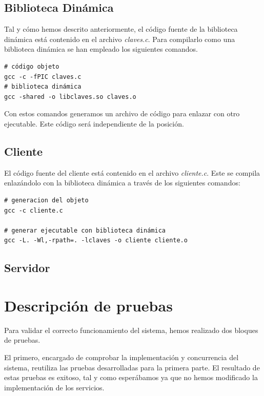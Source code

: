 \documentclass[]{article}
\begin{document}
\subsection{Biblioteca Dinámica}
\label{subsec:biblioteca}
Tal y cómo hemos descrito anteriormente, el código fuente de la biblioteca dinámica está contenido en el archivo \textit{claves.c}. Para compilarlo como una biblioteca dinámica se han empleado los siguientes comandos.

\begin{center}
\begin{lstlisting}[caption=Compiación de biblioteca dinámica]
# código objeto
gcc -c -fPIC claves.c
# biblioteca dinámica
gcc -shared -o libclaves.so claves.o
\end{lstlisting}
\end{center}

Con estos comandos generamos un archivo de código  para enlazar con otro ejecutable. Este código será independiente de la posición. 

\subsection{Cliente}
\label{subsec:cliente}
El código fuente del cliente está contenido en el archivo \textit{cliente.c}. Este se compila enlazándolo con la biblioteca dinámica a través de los siguientes comandos: 

\begin{center}
\begin{lstlisting}[caption=Compiación de biblioteca dinámica]
# generacion del objeto
gcc -c cliente.c

# generar ejecutable con biblioteca dinámica
gcc -L. -Wl,-rpath=. -lclaves -o cliente cliente.o
\end{lstlisting}
\end{center}

\subsection{Servidor}
\label{subsec:servidor}


\section{Descripción de pruebas}
\label{sec:descripcion_de_pruebas}
Para validar el correcto funcionamiento del sistema, hemos realizado dos bloques de pruebas. 

El primero, encargado de comprobar la implementación y concurrencia del sistema, reutiliza las pruebas desarrolladas para la primera parte. El resultado de estas pruebas es exitoso, tal y como esperábamos ya que no hemos modificado la implementación de los servicios.
\end{document}
